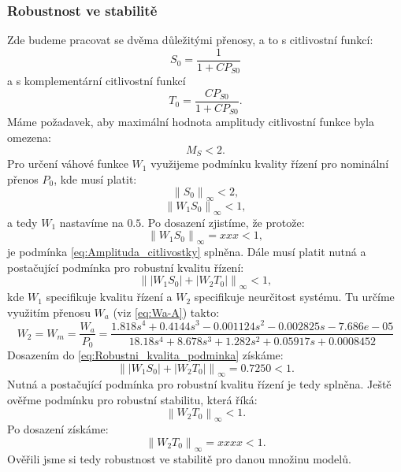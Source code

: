 \documentclass[a4paper,11pt]{article}
\begin{document}
\newpage
\subsubsection{Robustnost ve stabilitě}
Zde budeme pracovat se dvěma důležitými přenosy, a to s citlivostní funkcí:
\begin{equation}
S_{0}=\frac{1}{1+CP_{S0}}
\end{equation}
a s komplementární citlivostní funkcí
\begin{equation}
T_{0}=\frac{CP_{S0}}{1+CP_{S0}}.
\end{equation}
Máme požadavek, aby maximální hodnota amplitudy citlivostní funkce byla omezena:
\begin{equation}\label{eq:Amplituda_citlivostky} 
M_{S}<2.
\end{equation}
Pro určení váhové funkce $ W_{1} $ využijeme podmínku kvality řízení pro nominální přenos $ P_{0} $, kde musí platit:
\begin{equation}
\left \| S_{0} \right \|_{\infty }<2,
\end{equation}
\begin{equation}
\left \| W_{1}S_{0} \right \|_{\infty }<1,
\end{equation}
a tedy $  W_{1} $ nastavíme na $ 0.5 $. Po dosazení zjistíme, že protože:
\begin{equation}
\left \| W_{1}S_{0} \right \|_{\infty }=xxx<1,
\end{equation}
je podmínka \ref{eq:Amplituda_citlivostky} splněna.
Dále musí platit nutná a postačující podmínka pro robustní kvalitu řízení:
\begin{equation}\label{eq:Robustni_kvalita_podminka} 
\left \| \left | W_{1}S_{0} \right |+ \left | W_{2}T_{0} \right |\right \|_{\infty }< 1,
\end{equation}
kde $  W_{1} $ specifikuje kvalitu řízení a $  W_{2} $ specifikuje neurčitost systému. Tu určíme využitím přenosu $  W_{a} $ (viz \ref{eq:Wa-A}) takto:
\begin{equation}\label{eq:Wm=Wa/P0} 
W_{2}=W_{m}=\frac{W_{a}}{P_{0}}=\frac{1.818 s^{4} + 0.4144 s^{3} - 0.001124 s^{2} - 0.002825 s - 7.686e-05}{18.18 s^{4} + 8.678 s^{3} + 1.282 s^{2} + 0.05917 s + 0.0008452}
\end{equation}
Dosazením do \ref{eq:Robustni_kvalita_podminka} získáme:
\begin{equation} 
\left \| \left | W_{1}S_{0} \right |+ \left | W_{2}T_{0} \right |\right \|_{\infty }= 0.7250 <1.
\end{equation}
Nutná a postačující podmínka pro robustní kvalitu řízení je tedy splněna. Ještě ověřme podmínku pro robustní stabilitu, která říká:
\begin{equation} 
\left \| W_{2}T_{0}\right \|_{\infty }<1.
\end{equation}
Po dosazení získáme:
\begin{equation} 
\left \| W_{2}T_{0}\right \|_{\infty }=xxxx<1.
\end{equation}
Ověřili jsme si tedy robustnost ve stabilitě pro danou množinu modelů.
\end{document}
